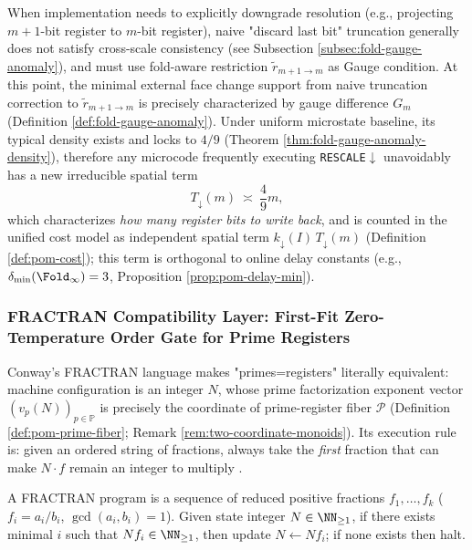 \begin{remark}\label{rem:pom-rescale-space-constant}
When implementation needs to explicitly downgrade resolution (e.g., projecting \(m{+}1\)-bit register to \(m\)-bit register), naive "discard last bit" truncation generally does not satisfy cross-scale consistency (see Subsection \ref{subsec:fold-gauge-anomaly}), and must use fold-aware restriction \(\widetilde r_{m+1\to m}\) as Gauge condition.
At this point, the minimal external face change support from naive truncation correction to \(\widetilde r_{m+1\to m}\) is precisely characterized by gauge difference \(G_m\) (Definition \ref{def:fold-gauge-anomaly}).
Under uniform microstate baseline, its typical density exists and locks to \(4/9\) (Theorem \ref{thm:fold-gauge-anomaly-density}), therefore any microcode frequently executing \texttt{RESCALE}$\downarrow$ unavoidably has a new irreducible spatial term
\[
T_{\downarrow}(m)\ \asymp\ \frac{4}{9}m,
\]
which characterizes \emph{how many register bits to write back}, and is counted in the unified cost model as independent spatial term $k_{\downarrow}(I)\,T_{\downarrow}(m)$ (Definition \ref{def:pom-cost}); this term is orthogonal to online delay constants (e.g., \(\delta_{\min}(\Fold_\infty)=3\), Proposition \ref{prop:pom-delay-min}).
\end{remark}

\subsubsection{FRACTRAN Compatibility Layer: First-Fit Zero-Temperature Order Gate for Prime Registers}\label{subsec:pom-fractran}
Conway's FRACTRAN language makes "primes=registers" literally equivalent: machine configuration is an integer \(N\), whose prime factorization exponent vector \((v_p(N))_{p\in\mathbb{P}}\) is precisely the coordinate of prime-register fiber \(\mathcal{P}\) (Definition \ref{def:pom-prime-fiber}; Remark \ref{rem:two-coordinate-monoids}). Its execution rule is: given an ordered string of fractions, always take the \emph{first} fraction that can make \(N\cdot f\) remain an integer to multiply \cite{Conway1987FRACTRAN}.

\begin{definition}\label{def:pom-fractran}
A FRACTRAN program is a sequence of reduced positive fractions
\(
f_1,\dots,f_k
 \)
(\(f_i=a_i/b_i\), \(\gcd(a_i,b_i)=1\)).
Given state integer \(N\in\NN_{\ge 1}\), if there exists minimal \(i\) such that \(Nf_i\in\NN_{\ge 1}\), then update \(N\leftarrow Nf_i\); if none exists then halt.
\end{definition}


